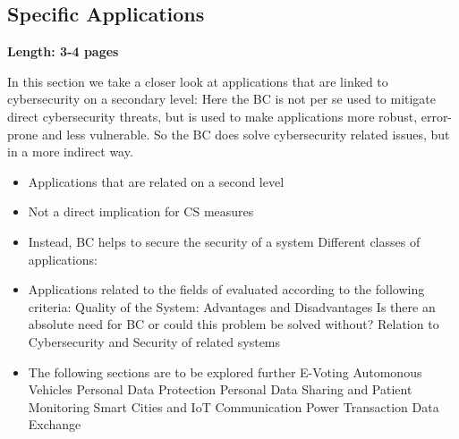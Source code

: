 \subsection{Specific Applications}
\label{subsec:03_applications}

\textbf{Length: 3-4 pages}

In this section we take a closer look at applications that are linked to cybersecurity on a secondary level: Here the BC is not per se used to mitigate direct cybersecurity threats, but is used to make applications more robust, error-prone and less vulnerable. So the BC does solve cybersecurity related issues, but in a more indirect way.

\begin{itemize}
\item Applications that are related on a second level
\item Not a direct implication for CS measures
\item Instead, BC helps to secure the security of a system
Different classes of applications:
\item Applications related to the fields of evaluated according to the following criteria:
\subitem Quality of the System: Advantages and Disadvantages
\subitem Is there an absolute need for BC or could this problem be solved without?
\subitem Relation to Cybersecurity and Security of related systems
\item The following sections are to be explored further
\subitem E-Voting \cite{Osgood2016} \cite{BenAyed2017}
\subitem Automonous Vehicles \cite{Dorri2017} \cite{Rowan2017}
\subitem Personal Data Protection \cite{Zyskind2015}
\subitem Personal Data Sharing and Patient Monitoring \cite{Yue2016}
\subitem Smart Cities and IoT \cite{Biswas2016}
\subitem Communication \cite{Rowan2017}
\subitem Power Transaction
\subitem Data Exchange

\end{itemize}
